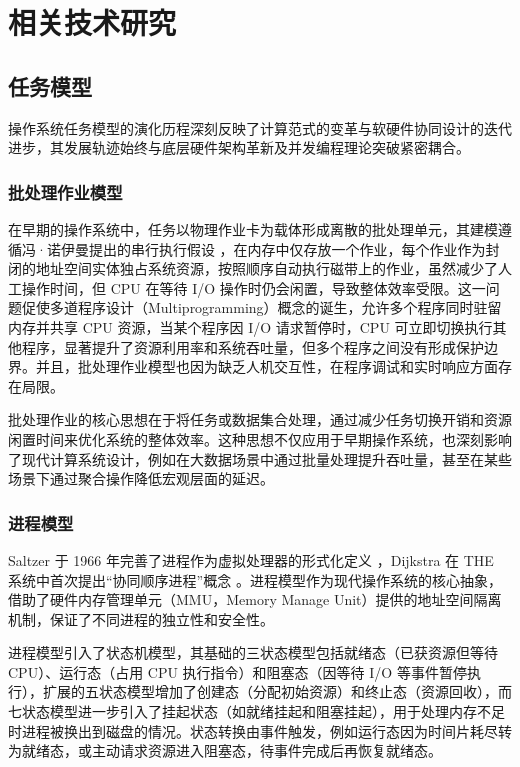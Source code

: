 \chapter{相关技术研究}

\section{任务模型}


操作系统任务模型的演化历程深刻反映了计算范式的变革与软硬件协同设计的迭代进步，其发展轨迹始终与底层硬件架构革新及并发编程理论突破紧密耦合。

\subsection{批处理作业模型}

在早期的操作系统中，任务以物理作业卡为载体形成离散的批处理单元，其建模遵循冯·诺伊曼提出的串行执行假设 \cite{VonNeumann}，在内存中仅存放一个作业，每个作业作为封闭的地址空间实体独占系统资源，按照顺序自动执行磁带上的作业，虽然减少了人工操作时间，但 CPU 在等待 I/O 操作时仍会闲置，导致整体效率受限。这一问题促使多道程序设计（Multiprogramming）概念的诞生，允许多个程序同时驻留内存并共享 CPU 资源，当某个程序因 I/O 请求暂停时，CPU 可立即切换执行其他程序，显著提升了资源利用率和系统吞吐量，但多个程序之间没有形成保护边界。并且，批处理作业模型也因为缺乏人机交互性，在程序调试和实时响应方面存在局限。
    
批处理作业的核心思想在于将任务或数据集合处理，通过减少任务切换开销和资源闲置时间来优化系统的整体效率。这种思想不仅应用于早期操作系统，也深刻影响了现代计算系统设计，例如在大数据场景中通过批量处理提升吞吐量，甚至在某些场景下通过聚合操作降低宏观层面的延迟。

\subsection{进程模型}
    
Saltzer 于 1966 年完善了进程作为虚拟处理器的形式化定义 \cite{saltzer1966traffic}，Dijkstra 在 THE 系统中首次提出“协同顺序进程”概念 \cite{dijkstra1968structure}。进程模型作为现代操作系统的核心抽象，借助了硬件内存管理单元（MMU，Memory Manage Unit）提供的地址空间隔离机制，保证了不同进程的独立性和安全性。

进程模型引入了状态机模型，其基础的三状态模型包括就绪态（已获资源但等待 CPU）、运行态（占用 CPU 执行指令）和阻塞态（因等待 I/O 等事件暂停执行），扩展的五状态模型增加了创建态（分配初始资源）和终止态（资源回收），而七状态模型进一步引入了挂起状态（如就绪挂起和阻塞挂起），用于处理内存不足时进程被换出到磁盘的情况。状态转换由事件触发，例如运行态因为时间片耗尽转为就绪态，或主动请求资源进入阻塞态，待事件完成后再恢复就绪态。

